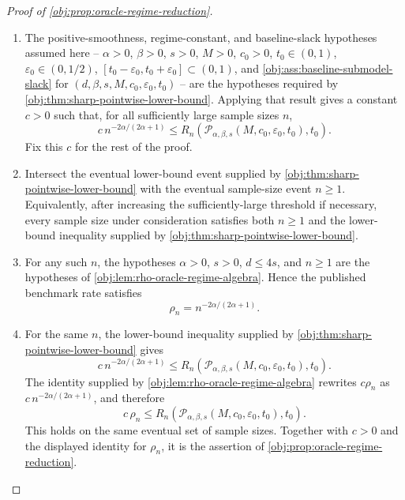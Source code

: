 \documentclass[11pt]{article}
\begin{document}
\begin{proof}[Proof of \cref{obj:prop:oracle-regime-reduction}]
\begin{enumerate}
\item The positive-smoothness, regime-constant, and baseline-slack hypotheses assumed here --
\(\alpha>0\), \(\beta>0\), \(s>0\), \(M>0\), \(c_0>0\), \(t_0\in(0,1)\),
\(\varepsilon_0\in(0,1/2)\), \([t_0-\varepsilon_0,t_0+\varepsilon_0]\subset(0,1)\),
and \cref{obj:ass:baseline-submodel-slack} for \((d,\beta,s,M,c_0,\varepsilon_0,t_0)\) --
are the hypotheses required by \cref{obj:thm:sharp-pointwise-lower-bound}. Applying that result gives
a constant \(c>0\) such that, for all sufficiently large sample sizes \(n\),
\[
c\, n^{-2\alpha/(2\alpha+1)}
\le
R_n\!\left(\mathcal P_{\alpha,\beta,s}(M,c_0,\varepsilon_0,t_0),t_0\right).
\]
Fix this \(c\) for the rest of the proof. %

\item Intersect the eventual lower-bound event supplied by \cref{obj:thm:sharp-pointwise-lower-bound}
with the eventual sample-size event \(n\ge1\). Equivalently, after increasing the sufficiently-large
threshold if necessary, every sample size under consideration satisfies both \(n\ge1\) and the
lower-bound inequality supplied by \cref{obj:thm:sharp-pointwise-lower-bound}.

\item For any such \(n\), the hypotheses \(\alpha>0\), \(s>0\), \(d\le4s\), and \(n\ge1\)
are the hypotheses of \cref{obj:lem:rho-oracle-regime-algebra}. Hence the published benchmark rate
satisfies
\[
\rho_n
=
n^{-2\alpha/(2\alpha+1)} .
\]

\item For the same \(n\), the lower-bound inequality supplied by
\cref{obj:thm:sharp-pointwise-lower-bound} gives
\[
c\, n^{-2\alpha/(2\alpha+1)}
\le
R_n\!\left(\mathcal P_{\alpha,\beta,s}(M,c_0,\varepsilon_0,t_0),t_0\right).
\]
The identity supplied by \cref{obj:lem:rho-oracle-regime-algebra} rewrites \(c\rho_n\) as
\(c\,n^{-2\alpha/(2\alpha+1)}\), and therefore
\[
c\,\rho_n
\le
R_n\!\left(\mathcal P_{\alpha,\beta,s}(M,c_0,\varepsilon_0,t_0),t_0\right).
\]
This holds on the same eventual set of sample sizes. Together with \(c>0\) and the displayed identity
for \(\rho_n\), it is the assertion of \cref{obj:prop:oracle-regime-reduction}.
\end{enumerate}
\end{proof}
\end{document}
